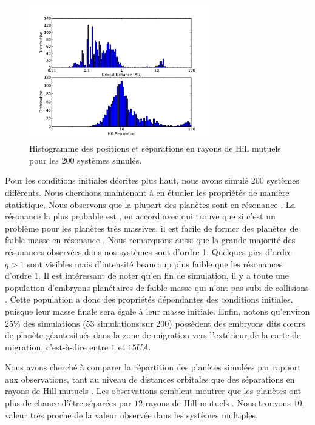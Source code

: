 \begin{figure}[htbp]
\centering
\includegraphics[width=0.7\textwidth]{figure/HSE/hist_ad.pdf}
\caption{Histogramme des positions et séparations en rayons de Hill mutuels pour les 200 systèmes
simulés.}\label{fig:HSE_stat_dist}
\end{figure}

Pour les conditions initiales décrites plus haut, nous avons simulé 200 systèmes différents. Nous cherchons maintenant à en
étudier les propriétés de manière statistique. Nous observons que la plupart des planètes sont en résonance
. La résonance la plus probable est , en accord avec \cite{rein2012traditional} qui trouve que si
c'est un problème pour les planètes très massives, il est facile de former des planètes de faible masse en résonance .
Nous remarquons aussi que la grande majorité des résonances observées dans nos systèmes sont d'ordre 1. Quelques pics d'ordre
$q>1$ sont visibles mais d'intensité beaucoup plus faible que les résonances d'ordre 1. Il
est intéressant de noter qu'en fin de simulation, il y a toute une population d'embryons planétaires de faible masse qui n'ont
pas subi de collisions . Cette population a donc des propriétés dépendantes des conditions initiales,
puisque leur masse finale sera égale à leur masse initiale. Enfin, notons qu'environ 25\% des simulations (53 simulations sur 200) possèdent des embryons dits \og cœurs de planète géante\fg situés dans la zone de migration vers l'extérieur de la carte de migration, c'est-à-dire entre $1$ et $15\unit{UA}$.

Nous avons cherché à comparer la répartition des planètes simulées par rapport aux observations, tant au niveau de distances orbitales que des séparations en rayons de Hill mutuels . Les observations semblent montrer que les planètes ont plus de chance d'être séparées par $12$ rayons de Hill mutuels . Nous trouvons $10$, valeur très proche de la valeur observée dans les systèmes multiples. 

